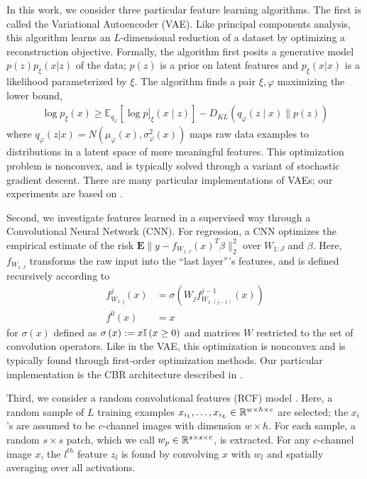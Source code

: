 In this work, we consider three particular feature learning algorithms. The
first is called the Variational Autoencoder (VAE). Like principal components
analysis, this algorithm learns an $L$-dimensional reduction of a dataset by
optimizing a reconstruction objective. Formally, the algorithm first posits a
generative model $p\left(z\right)p_{\xi}\left(x \vert z\right)$ of the data;
$p\left(z\right)$ is a prior on latent features and $p_{\xi}\left(x \vert
x\right)$ is a likelihood parameterized by $\xi$. The algorithm finds a pair
$\xi, \varphi$ maximizing the lower bound,
\begin{align*}
\log p_{\xi}\left(x\right) \geq  \mathbb{E}_{q_{\varphi}}\left[\log p]_{\xi}(x \mid z)\right]-D_{KL}\left(q_{\varphi}(z \mid x) \| p(z)\right)
\end{align*}
where $q_{\varphi}\left(z \vert x\right) = N\left(\mu_{\varphi}\left(x\right),
\sigma^{2}_{\varphi}\left(x\right)\right)$ maps raw data examples to
distributions in a latent space of more meaningful features. This optimization
problem is nonconvex, and is typically solved through a variant of stochastic
gradient descent. There are many particular implementations of VAEs; our
experiments are based on \citep{van2017neural}.

Second, we investigate features learned in a supervised way through a
Convolutional Neural Network (CNN). For regression, a CNN optimizes the
empirical estimate of the risk $\mathbf{E}\|y -
f_{W_{1:J}}\left(x\right)^{T}\beta\|_{2}^{2}$ over $W_{1:J}$ and $\beta$. Here,
$f_{W_{1:J}}$ transforms the raw input into the ``last layer''’s features, and
is defined recursively according to
\begin{align*}
f^{j}_{W_{1:j}}\left(x\right) &= \sigma\left(W_{j}f^{j - 1}_{W_{1:(j - 1)}}\left(x\right)\right)\\
f^{0}\left(x\right) &= x
\end{align*}
for $\sigma\left(x\right)$ defined as $\sigma\left(x\right) := x \mathbb{I}\left({x \geq
  0}\right)$ and matrices $W$ restricted to the set of convolution operators. Like in
the VAE, this optimization is nonconvex and is typically found through
first-order optimization methods. Our particular implementation is the CBR
architecture described in \citep{raghu2017svcca}.

Third, we consider a random convolutional features (RCF) model
\citep{rahimi2008weighted}. Here, a random sample of $L$ training examples
$x_{i_1}, \dots, x_{i_L} \in \mathbb{R}^{w \times h \times c}$ are selected; the
$x_{i}$'s are assumed to be $c$-channel images with dimension $w\times h$. For
each sample, a random $s \times s$ patch, which we call $w_{p} \in \mathbb{R}^{s
  \times s \times c}$, is extracted. For any $c$-channel image $x$, the $l^{th}$
feature $z_{l}$ is found by convolving $x$ with $w_{l}$ and spatially averaging
over all activations.

